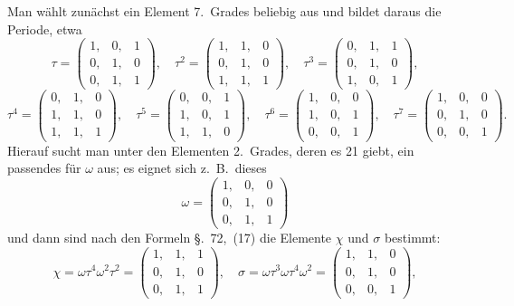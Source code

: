 \documentclass[12pt,a4paper]{article}
\begin{document}
Man w\"ahlt zun\"achst ein Element 7.~Grades beliebig aus und bildet daraus die Periode, etwa
\[
\tau =
\begin{pmatrix} 1,& 0,& 1\\ 0,& 1,& 0\\ 0,& 1,& 1\end{pmatrix},\quad
\tau^2 =
\begin{pmatrix} 1,& 1,& 0\\ 0,& 1,& 0\\ 1,& 1,& 1\end{pmatrix},\quad
\tau^3 =
\begin{pmatrix} 0,& 1,& 1\\ 0,& 1,& 0\\ 1,& 0,& 1\end{pmatrix},
\]
\[
\tau^4 =
\begin{pmatrix} 0,& 1,& 0\\ 1,& 1,& 0\\ 1,& 1,& 1\end{pmatrix},\quad
\tau^5 =
\begin{pmatrix} 0,& 0,& 1\\ 1,& 0,& 1\\ 1,& 1,& 0\end{pmatrix},\quad
\tau^6 =
\begin{pmatrix} 1,& 0,& 0\\ 1,& 0,& 1\\ 0,& 0,& 1\end{pmatrix},\quad
\tau^7 =
\begin{pmatrix} 1,& 0,& 0\\ 0,& 1,& 0\\ 0,& 0,& 1\end{pmatrix}.
\]
Hierauf sucht man unter den Elementen 2.~Grades, deren es 21 giebt, ein passendes f\"ur $\omega$ aus; es eignet sich z.~B.\ dieses
\begin{equation}
\tag{3}
\omega =
\begin{pmatrix} 1,& 0,& 0\\ 0,& 1,& 0\\ 0,& 1,& 1\end{pmatrix}
\end{equation}
und dann sind nach den Formeln \S.~72,~(17) die Elemente $\chi$ und $\sigma$ bestimmt:
\[
\chi = \omega\tau^4\omega^2\tau^2 =
\begin{pmatrix} 1,& 1,& 1\\ 0,& 1,& 0\\ 0,& 1,& 1\end{pmatrix},\quad
\sigma = \omega\tau^3\omega\tau^4\omega^2 =
\begin{pmatrix} 1,& 1,& 0\\ 0,& 1,& 0\\ 0,& 0,& 1\end{pmatrix},
\]
\end{document}
